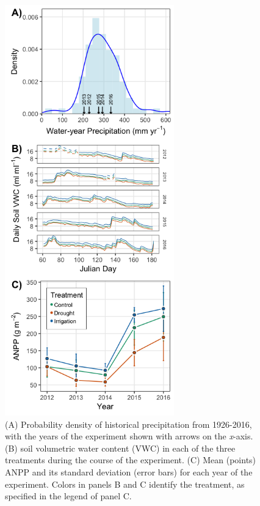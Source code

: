 \documentclass[fleqn,10pt,lineno]{wlpeerj} %
\begin{document}
\begin{figure}[!ht]
  \centering
      \includegraphics[height=7in]{../figures/data_panels.png}
  \caption{(A) Probability density of historical precipitation from 1926-2016, with the years of the experiment shown with arrows on the \emph{x}-axis. (B)  soil volumetric water content (VWC) in each of the three treatments during the course of the experiment. (C) Mean (points) ANPP and its standard deviation (error bars) for each year of the experiment. Colors in panels B and C identify the treatment, as specified in the legend of panel C.}
\end{figure}

\newpage{}
\end{document}
